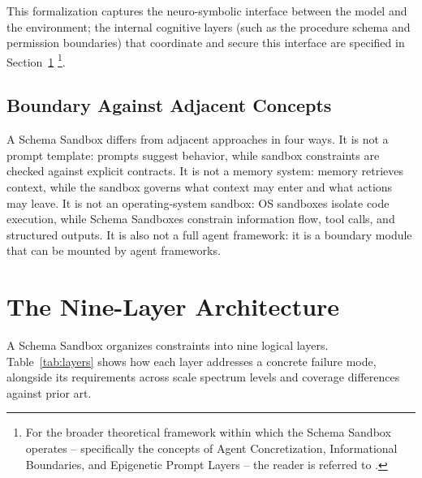 \documentclass[10pt,journal,compsoc]{IEEEtran}
\begin{document}
This formalization captures the neuro-symbolic interface between the model and the environment; the internal cognitive layers (such as the procedure schema and permission boundaries) that coordinate and secure this interface are specified in Section~\ref{sec:architecture} \footnote{For the broader theoretical framework within which the Schema Sandbox operates -- specifically the concepts of Agent Concretization, Informational Boundaries, and Epigenetic Prompt Layers -- the reader is referred to \cite{liu2026concretization}.}.


\subsection{Boundary Against Adjacent Concepts}
A Schema Sandbox differs from adjacent approaches in four ways. It is not a prompt template: prompts suggest behavior, while sandbox constraints are checked against explicit contracts. It is not a memory system: memory retrieves context, while the sandbox governs what context may enter and what actions may leave. It is not an operating-system sandbox: OS sandboxes isolate code execution, while Schema Sandboxes constrain information flow, tool calls, and structured outputs. It is also not a full agent framework: it is a boundary module that can be mounted by agent frameworks.

\section{The Nine-Layer Architecture}
\label{sec:architecture}
A Schema Sandbox organizes constraints into nine logical layers. Table~\ref{tab:layers} shows how each layer addresses a concrete failure mode, alongside its requirements across scale spectrum levels and coverage differences against prior art.
\end{document}
